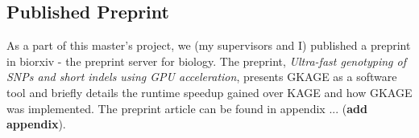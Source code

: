 \subsection{Published Preprint}
As a part of this master's project, we (my supervisors and I) published a preprint \cite{preprint} in biorxiv - the preprint server for biology.
The preprint, \textit{Ultra-fast genotyping of SNPs and short indels using GPU acceleration}, presents GKAGE as a software tool and briefly details the runtime speedup gained over KAGE and how GKAGE was implemented.
The preprint article can be found in appendix ... (\textbf{add appendix}).
